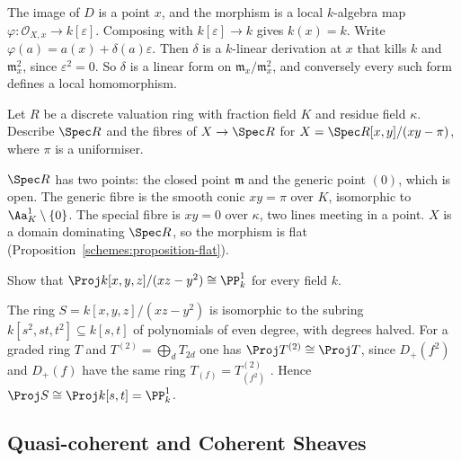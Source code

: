 \begin{solution}
The image of $D$ is a point $x$, and the morphism is a local $k$-algebra map $\varphi \colon \mathcal{O}_{X,x} \to k[\varepsilon]$. Composing with
$k[\varepsilon] \to k$ gives $k(x) = k$. Write $\varphi(a) = a(x) + \delta(a)\varepsilon$. Then $\delta$ is a $k$-linear derivation at $x$ that kills $k$ and $\mathfrak{m}_x^2$,
since $\varepsilon^2 = 0$. So $\delta$ is a linear form on $\mathfrak{m}_x/\mathfrak{m}_x^2$, and conversely every such form defines a local homomorphism.
\end{solution}

\begin{exercise}\label{schemes:exercise-dvr}
Let $R$ be a discrete valuation ring with fraction field $K$ and residue field $\kappa$. Describe $\Spec R$ and the fibres of $X \to \Spec R$ for
$X = \Spec R[x, y]/(xy - \pi)$, where $\pi$ is a uniformiser.
\end{exercise}

\begin{solution}
$\Spec R$ has two points: the closed point $\mathfrak{m}$ and the generic point $(0)$, which is open. The generic fibre is the smooth conic $xy = \pi$ over
$K$, isomorphic to $\Aa^1_K \setminus \{0\}$. The special fibre is $xy = 0$ over $\kappa$, two lines meeting in a point. $X$ is a domain dominating $\Spec R$,
so the morphism is flat (Proposition~\ref{schemes:proposition-flat}).
\end{solution}

\begin{exercise}\label{schemes:exercise-proj-conic}
Show that $\Proj k[x, y, z]/(xz - y^2) \cong \PP^1_k$ for every field $k$.
\end{exercise}

\begin{solution}
The ring $S = k[x, y, z]/(xz - y^2)$ is isomorphic to the subring $k[s^2, st, t^2] \subseteq k[s, t]$ of polynomials of even degree, with degrees halved.
For a graded ring $T$ and $T^{(2)} = \bigoplus_dT_{2d}$ one has $\Proj T^{(2)} \cong \Proj T$, since $D_+(f^2)$ and $D_+(f)$ have the same ring
$T_{(f)} = T^{(2)}_{(f^2)}$ \cite[Exercise II.5.13]{hartshorne-ag}. Hence $\Proj S \cong \Proj k[s, t] = \PP^1_k$.
\end{solution}

\subsection{Quasi-coherent and Coherent Sheaves}\label{schemes:subsection-exercises-coherent-sheaves}

